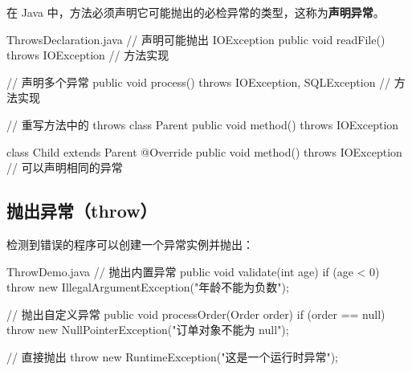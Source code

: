 在 Java 中，方法必须声明它可能抛出的必检异常的类型，这称为\textbf{声明异常}。

\begin{codeblock}[Java]{ThrowsDeclaration.java}
// 声明可能抛出 IOException
public void readFile() throws IOException {
    // 方法实现
}

// 声明多个异常
public void process() throws IOException, SQLException {
    // 方法实现
}

// 重写方法中的 throws
class Parent {
    public void method() throws IOException {}
}

class Child extends Parent {
    @Override
    public void method() throws IOException {}  // 可以声明相同的异常
}
\end{codeblock}


\subsection{抛出异常（throw）}

检测到错误的程序可以创建一个异常实例并抛出：

\begin{codeblock}[Java]{ThrowDemo.java}
// 抛出内置异常
public void validate(int age) {
    if (age < 0) {
        throw new IllegalArgumentException("年龄不能为负数");
    }
}

// 抛出自定义异常
public void processOrder(Order order) {
    if (order == null) {
        throw new NullPointerException("订单对象不能为 null");
    }
}

// 直接抛出
throw new RuntimeException("这是一个运行时异常");
\end{codeblock}


